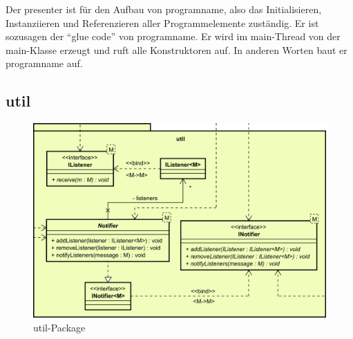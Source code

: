 \medskip
Der presenter ist für den Aufbau von \gls{programname}, also das
Initialisieren, Instanziieren und Referenzieren aller Programmelemente zuständig.
Er ist sozusagen der ``glue code'' von \gls{programname}.
Er wird im main-Thread von der main-Klasse erzeugt und ruft alle Konstruktoren auf.
In anderen Worten baut er \gls{programname} auf.

\subsection{util}
\label{subsec:util}

\begin{figure}[H]
  \centering
  \includegraphics[width=\textwidth]{../diagramimages/util.png}
  \caption{util-Package}
\end{figure}

